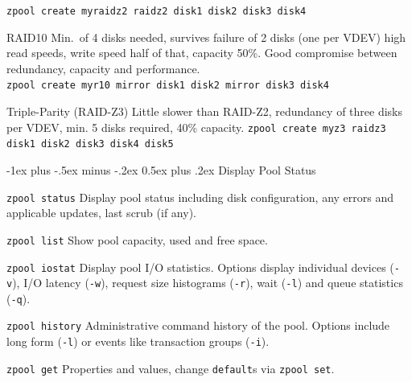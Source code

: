 \documentclass[10pt,landscape,letter]{article}
\makeatletter
\renewcommand{\section}{\@startsection{section}{1}{0mm}%
                                {-1ex plus -.5ex minus -.2ex}%
                                {0.5ex plus .2ex}%
                                {\normalfont\large\bfseries}}
\makeatother
\begin{document}
\begin{multicols}{3}
\begin{Description}
      \texttt{zpool create myraidz2 raidz2 disk1 disk2 disk3 disk4}
    \item[RAID10] Min.\ of 4 disks needed, survives failure of 2 disks (one per VDEV)
      high read speeds, write speed half of that, capacity 50\%. Good compromise
      between redundancy, capacity and performance.\\ \texttt{zpool create
      myr10 mirror disk1 disk2 mirror disk3 disk4}
    \item[Triple-Parity (RAID-Z3)] Little slower than RAID-Z2, redundancy of
      three disks per VDEV, min. 5 disks required, 40\% capacity.
      \texttt{zpool create myz3 raidz3 disk1 disk2 disk3 disk4 disk5}
  \end{Description}

	\section{Display Pool Status}
	\begin{Description}
    \item[\texttt{zpool status}] Display pool status including disk
      configuration, any errors and applicable updates, last scrub (if any).
		\item[\texttt{zpool list}] Show pool capacity, used and free space.
    \item[\texttt{zpool iostat}] Display pool I/O statistics. Options
      display individual devices (\texttt{-v}), I/O latency (\texttt{-w}),
      request size histograms (\texttt{-r}), wait (\texttt{-l}) and queue
      statistics (\texttt{-q}).
    \item[\texttt{zpool history}] Administrative command history of the pool.
      Options include long form (\texttt{-l}) or events like transaction groups
      (\texttt{-i}).
    \item[\texttt{zpool get}] Properties and values, change \texttt{default}s
      via \texttt{zpool set}.
	\end{Description}


\end{multicols}
\end{document}
